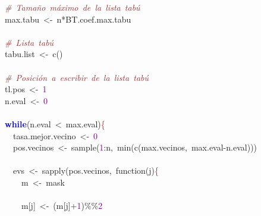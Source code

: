 \mbox{}\ \ \textit{\textcolor{Brown}{\#\ Tamaño\ máximo\ de\ la\ lista\ tabú}} \\
\mbox{}\ \ max\textcolor{BrickRed}{.}tabu\ \textcolor{BrickRed}{\textless{}-}\ n\textcolor{BrickRed}{*}BT\textcolor{BrickRed}{.}coef\textcolor{BrickRed}{.}max\textcolor{BrickRed}{.}tabu \\
\mbox{}\ \  \\
\mbox{}\ \ \textit{\textcolor{Brown}{\#\ Lista\ tabú}} \\
\mbox{}\ \ tabu\textcolor{BrickRed}{.}list\ \textcolor{BrickRed}{\textless{}-}\ c\textcolor{BrickRed}{()} \\
\mbox{}\ \  \\
\mbox{}\ \ \textit{\textcolor{Brown}{\#\ Posición\ a\ escribir\ de\ la\ lista\ tabú}} \\
\mbox{}\ \ tl\textcolor{BrickRed}{.}pos\ \textcolor{BrickRed}{\textless{}-}\ \textcolor{Purple}{1} \\
\mbox{}\ \ n\textcolor{BrickRed}{.}eval\ \textcolor{BrickRed}{\textless{}-}\ \textcolor{Purple}{0} \\
\mbox{}\ \  \\
\mbox{}\ \ \textbf{\textcolor{Blue}{while}}\textcolor{BrickRed}{(}n\textcolor{BrickRed}{.}eval\ \textcolor{BrickRed}{\textless{}}\ max\textcolor{BrickRed}{.}eval\textcolor{BrickRed}{)}\textcolor{Red}{\{} \\
\mbox{}\ \ \ \ tasa\textcolor{BrickRed}{.}mejor\textcolor{BrickRed}{.}vecino\ \textcolor{BrickRed}{\textless{}-}\ \textcolor{Purple}{0} \\
\mbox{}\ \ \ \ pos\textcolor{BrickRed}{.}vecinos\ \textcolor{BrickRed}{\textless{}-}\ sample\textcolor{BrickRed}{(}\textcolor{Purple}{1}\textcolor{BrickRed}{:}n\textcolor{BrickRed}{,}\ min\textcolor{BrickRed}{(}c\textcolor{BrickRed}{(}max\textcolor{BrickRed}{.}vecinos\textcolor{BrickRed}{,}\ max\textcolor{BrickRed}{.}eval\textcolor{BrickRed}{-}n\textcolor{BrickRed}{.}eval\textcolor{BrickRed}{)))} \\
\mbox{}\ \ \ \  \\
\mbox{}\ \ \ \ evs\ \textcolor{BrickRed}{\textless{}-}\ sapply\textcolor{BrickRed}{(}pos\textcolor{BrickRed}{.}vecinos\textcolor{BrickRed}{,}\ function\textcolor{BrickRed}{(}j\textcolor{BrickRed}{)}\textcolor{Red}{\{} \\
\mbox{}\ \ \ \ \ \ m\ \textcolor{BrickRed}{\textless{}-}\ mask \\
\mbox{}\ \ \ \ \ \  \\
\mbox{}\ \ \ \ \ \ m\textcolor{BrickRed}{[}j\textcolor{BrickRed}{]}\ \textcolor{BrickRed}{\textless{}-}\ \textcolor{BrickRed}{(}m\textcolor{BrickRed}{[}j\textcolor{BrickRed}{]+}\textcolor{Purple}{1}\textcolor{BrickRed}{)\%\%}\textcolor{Purple}{2} \\
